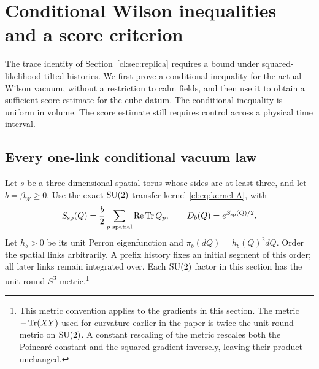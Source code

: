 \section{Conditional Wilson inequalities and a score criterion}\label{cl:sec:fisher}

The trace identity of Section~\ref{cl:sec:replica} requires a bound under
squared-likelihood tilted histories. We first prove a conditional
inequality for the actual Wilson vacuum, without a restriction to calm
fields, and then use it to obtain a sufficient score estimate for the
cube datum. The conditional inequality is uniform in volume. The score
estimate still requires control across a physical time interval.

\subsection{Every one-link conditional vacuum law}
Let $s$ be a three-dimensional spatial torus whose sides are at least three,
and let $b=\beta_W\ge0$. Use the exact $\mathrm{SU}(2)$ transfer kernel
\eqref{cl:eq:kernel-A}, with
\[
S_{\rm sp}(Q)=\frac b2\sum_{p\text{ spatial}}\operatorname{Re}\operatorname{Tr} Q_p,
\qquad D_b(Q)=e^{S_{\rm sp}(Q)/2}.
\]
Let $h_b>0$ be its unit Perron eigenfunction and
$\pi_b(dQ)=h_b(Q)^2dQ$. Order the spatial links arbitrarily. A prefix
history fixes an initial segment of this order; all later links remain
integrated over. Each $\mathrm{SU}(2)$ factor in this section has the unit-round
$S^3$ metric.\footnote{This metric convention applies to the gradients in
this section. The metric $-\operatorname{Tr}(XY)$ used for curvature earlier in the
paper is twice the unit-round metric on $\mathrm{SU}(2)$. A constant rescaling
of the metric rescales both the Poincar\'e constant and the squared
gradient inversely, leaving their product unchanged.}

